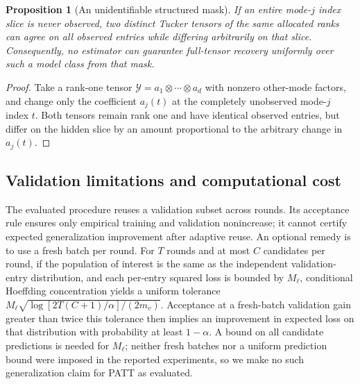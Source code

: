 \documentclass[review,10pt]{elsarticle}
\newtheorem{proposition}{Proposition}
\newcommand{\cY}{\mathcal Y}
\begin{document}
\begin{proposition}[An unidentifiable structured mask]\label{prop:masknegative}
If an entire mode-$j$ index slice is never observed, two distinct Tucker tensors of the same allocated ranks can agree on all observed entries while differing arbitrarily on that slice. Consequently, no estimator can guarantee full-tensor recovery uniformly over such a model class from that mask.
\end{proposition}
\begin{proof}
Take a rank-one tensor $\cY=a_1\otimes\cdots\otimes a_d$ with nonzero other-mode factors, and change only the coefficient $a_j(t)$ at the completely unobserved mode-$j$ index $t$. Both tensors remain rank one and have identical observed entries, but differ on the hidden slice by an amount proportional to the arbitrary change in $a_j(t)$.\end{proof}


\subsection{Validation limitations and computational cost}\label{subsec:complexity}
The evaluated procedure reuses a validation subset across rounds. Its acceptance rule ensures only empirical training and validation nonincrease; it cannot certify expected generalization improvement after adaptive reuse. An optional remedy is to use a fresh batch per round. For $T$ rounds and at most $C$ candidates per round, if the population of interest is the same as the independent validation-entry distribution, and each per-entry squared loss is bounded by $M_\ell$, conditional Hoeffding concentration yields a uniform tolerance $M_\ell\sqrt{\log[2T(C+1)/\alpha]/(2m_v)}$. Acceptance at a fresh-batch validation gain greater than twice this tolerance then implies an improvement in expected loss on that distribution with probability at least $1-\alpha$. A bound on all candidate predictions is needed for $M_\ell$; neither fresh batches nor a uniform prediction bound were imposed in the reported experiments, so we make no such generalization claim for PATT as evaluated.
\end{document}
